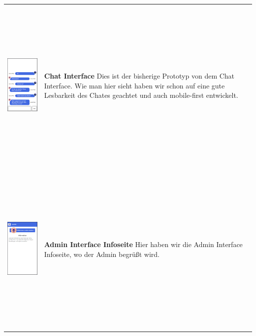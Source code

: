 \begin{tabular}{C{6cm}  L{7cm}}
    \includegraphics[width=5cm,height=8.5cm]{bilder/prototyp UI Design/Chatinterface mobil.png}                                       & \textbf{Chat Interface} \newline
    Dies ist der bisherige Prototyp von dem Chat Interface. Wie man hier sieht haben wir schon auf eine 
    gute Lesbarkeit des Chates geachtet und auch mobile-first entwickelt.                                                                                                          \\
    \includegraphics[width=5cm,height=8.5cm]{bilder/prototyp UI Design/admininteface.png}                                             & \textbf{Admin Interface Infoseite} \newline
    Hier haben wir die Admin Interface Infoseite, wo der Admin begrüßt wird.                                                                                        
\end{tabular}

